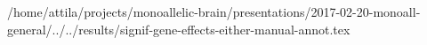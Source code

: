/home/attila/projects/monoallelic-brain/presentations/2017-02-20-monoall-general/../../results/signif-gene-effects-either-manual-annot.tex